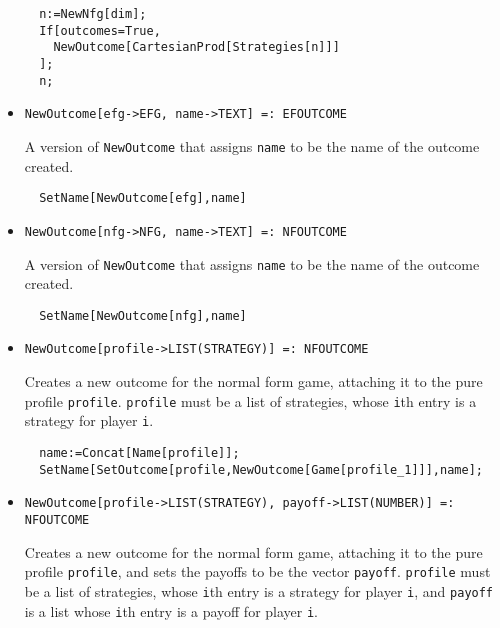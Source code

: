 \begin{itemize}
\begin{verbatim}
  n:=NewNfg[dim];
  If[outcomes=True,
    NewOutcome[CartesianProd[Strategies[n]]]
  ];
  n;
\end{verbatim} 
\ed

\item{}
\protect \large \begin{verbatim}
NewOutcome[efg->EFG, name->TEXT] =: EFOUTCOME 
\end{verbatim}\normalsize

\bd 
A version of \verb+NewOutcome+ that assigns \verb+name+ to be the name
of the outcome created.  
\begin{verbatim}
  SetName[NewOutcome[efg],name]
\end{verbatim} 
\ed

\item{}
\protect \large \begin{verbatim}
NewOutcome[nfg->NFG, name->TEXT] =: NFOUTCOME 
\end{verbatim}\normalsize

\bd 
A version of \verb+NewOutcome+ that assigns \verb+name+ to be the name
of the outcome created.  
\begin{verbatim}
  SetName[NewOutcome[nfg],name]
\end{verbatim} 
\ed

\item{}
\protect \large \begin{verbatim}
NewOutcome[profile->LIST(STRATEGY)] =: NFOUTCOME 
\end{verbatim}\normalsize

\bd 
Creates a new outcome for the normal form game, attaching it to
the pure profile \verb+profile+.  \verb+profile+ must be a list of
strategies, whose \verb+i+th entry is a strategy for player \verb+i+. 


\begin{verbatim}
  name:=Concat[Name[profile]];
  SetName[SetOutcome[profile,NewOutcome[Game[profile_1]]],name];
\end{verbatim} 
\ed

\item{}
\protect \large \begin{verbatim}
NewOutcome[profile->LIST(STRATEGY), payoff->LIST(NUMBER)] =: NFOUTCOME 
\end{verbatim}\normalsize
 
\bd 
Creates a new outcome for the normal form game, attaching it to
the pure profile \verb+profile+, and sets the payoffs to be the vector
\verb+payoff+.  \verb+profile+ must be a list of strategies, whose
\verb+i+th entry is a strategy for player \verb+i+, and \verb+payoff+
is a list whose \verb+i+th entry is a payoff for player \verb+i+.


\end{itemize}
